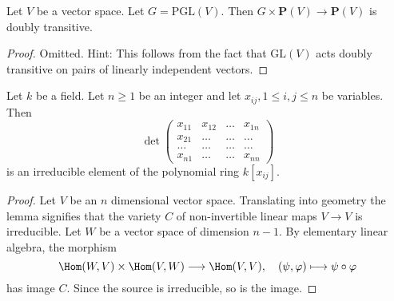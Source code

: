 \begin{lemma}
\label{lemma-doubly-transitive}
Let $V$ be a vector space. Let $G = \text{PGL}(V)$.
Then $G \times \mathbf{P}(V) \to \mathbf{P}(V)$ is
doubly transitive.
\end{lemma}

\begin{proof}
Omitted. Hint: This follows from the fact that $\text{GL}(V)$ acts doubly
transitive on pairs of linearly independent vectors.
\end{proof}

\begin{lemma}
\label{lemma-determinant}
Let $k$ be a field. Let $n \geq 1$ be an integer and let
$x_{ij}, 1 \leq i, j \leq n$ be variables. Then
$$
\det
\left(
\begin{matrix}
x_{11} & x_{12} & \ldots & x_{1n} \\
x_{21} & \ldots & \ldots & \ldots \\
\ldots & \ldots & \ldots & \ldots \\
x_{n1} & \ldots & \ldots & x_{nn}
\end{matrix}
\right)
$$
is an irreducible element of the polynomial ring $k[x_{ij}]$.
\end{lemma}

\begin{proof}
Let $V$ be an $n$ dimensional vector space. Translating into geometry
the lemma signifies that the variety $C$ of non-invertible linear maps
$V \to V$ is irreducible. Let $W$ be a vector space of dimension $n - 1$.
By elementary linear algebra, the morphism
$$
\Hom(W, V) \times \Hom(V, W) \longrightarrow \Hom(V, V),\quad
(\psi, \varphi) \longmapsto \psi \circ \varphi
$$
has image $C$. Since the source is irreducible, so is the image.
\end{proof}

